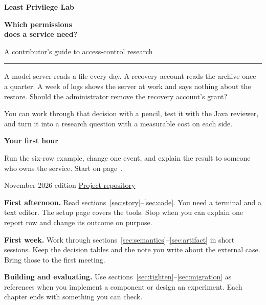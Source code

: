 \documentclass[11pt,a4paper]{article}
\newcommand{\sub}[1]{\par\medskip{\large\sffamily\bfseries\color{pine}#1\par}\nobreak}
\newcommand{\booklink}[2]{\href{#1}{\textsf{#2}}}
\begin{document}
\color{ink}
\begin{titlepage}\thispagestyle{empty}
\vspace*{14mm}
{\sffamily\bfseries\large\color{pine}Least Privilege Lab\par}
\vspace{12mm}
{\sffamily\bfseries\fontsize{39}{43}\selectfont Which permissions\\does a service need?\par}
\vspace{5mm}
{\sffamily\Large A contributor's guide to access-control research\par}
\vspace{13mm}
{\color{pine}\rule{38mm}{1.7pt}}\par
\vspace{6mm}
\begin{minipage}{0.88\textwidth}
A model server reads a file every day. A recovery account reads the archive once a quarter. A week of logs shows the server at work and says nothing about the restore. Should the administrator remove the recovery account's grant?

You can work through that decision with a pencil, test it with the Java reviewer, and turn it into a research question with a measurable cost on each side.
\end{minipage}

\vfill
{\sffamily\bfseries\color{pine}Your first hour\par}
Run the six-row example, change one event, and explain the result to someone who owns the service. Start on page~\pageref{sec:story}.
\vspace{6mm}

{\small November 2026 edition\quad\textbullet\quad
\booklink{https://github.com/oraoraoraaa/least-privilege-lab}{Project repository}}
\end{titlepage}
\setcounter{page}{2}

\tableofcontents
\sub{Choose a place to start}
\textbf{First afternoon.} Read sections~\ref{sec:story}--\ref{sec:code}. You need a terminal and a text editor. The setup page covers the tools. Stop when you can explain one report row and change its outcome on purpose.

\textbf{First week.} Work through sections~\ref{sec:semantics}--\ref{sec:artifact} in short sessions. Keep the decision tables and the note you write about the external case. Bring those to the first meeting.

\textbf{Building and evaluating.} Use sections~\ref{sec:tighten}--\ref{sec:migration} as references when you implement a component or design an experiment. Each chapter ends with something you can check.
\end{document}
